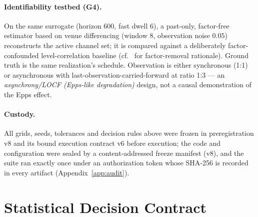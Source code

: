 \documentclass[11pt]{article}
\begin{document}
\paragraph{Identifiability testbed (G4).}
On the same surrogate (horizon 600, fast dwell 6), a past-only,
factor-free estimator based on venue differencing (window 8, observation noise
$0.05$) reconstructs the active channel set; it is compared against a
deliberately factor-confounded level-correlation baseline
(cf.\ \citep{fan2013large,barigozzi2017network} for factor-removal rationale).
Ground truth is the same realization's schedule. Observation is either
synchronous (1:1) or asynchronous with last-observation-carried-forward at
ratio 1:3 --- an \emph{asynchrony/LOCF (Epps-like degradation)} design, not a
causal demonstration of the Epps effect.

\paragraph{Custody.}
All grids, seeds, tolerances and decision rules above were frozen in
preregistration v8 and its bound execution contract v6 before execution; the
code and configuration were sealed by a content-addressed freeze manifest
(v8), and the suite ran exactly once under an authorization token whose
SHA-256 is recorded in every artifact (Appendix~\ref{app:audit}).

\section{Statistical Decision Contract}
\label{sec:contract}
\end{document}
